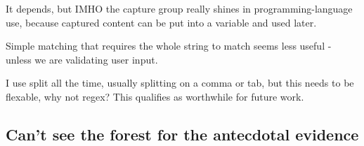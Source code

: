  It depends, but IMHO the capture group really shines in programming-language use, because captured content can be put into a variable and used later.

 Simple matching that requires the whole string to match seems less useful - unless we are validating user input.


 I use split all the time, usually splitting on a comma or tab, but this needs to be flexable, why not regex?  This qualifies as worthwhile for future work.

 \subsection{Can't see the forest for the antecdotal evidence}





